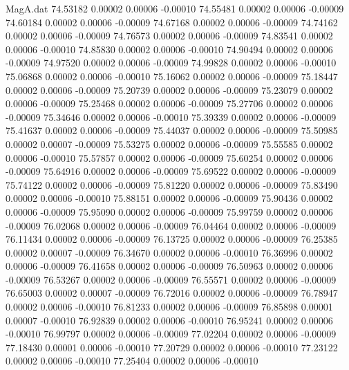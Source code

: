 \begin{filecontents}{MagA.dat}
  74.53182    0.00002    0.00006   -0.00010
  74.55481    0.00002    0.00006   -0.00009
  74.60184    0.00002    0.00006   -0.00009
  74.67168    0.00002    0.00006   -0.00009
  74.74162    0.00002    0.00006   -0.00009
  74.76573    0.00002    0.00006   -0.00009
  74.83541    0.00002    0.00006   -0.00010
  74.85830    0.00002    0.00006   -0.00010
  74.90494    0.00002    0.00006   -0.00009
  74.97520    0.00002    0.00006   -0.00009
  74.99828    0.00002    0.00006   -0.00010
  75.06868    0.00002    0.00006   -0.00010
  75.16062    0.00002    0.00006   -0.00009
  75.18447    0.00002    0.00006   -0.00009
  75.20739    0.00002    0.00006   -0.00009
  75.23079    0.00002    0.00006   -0.00009
  75.25468    0.00002    0.00006   -0.00009
  75.27706    0.00002    0.00006   -0.00009
  75.34646    0.00002    0.00006   -0.00010
  75.39339    0.00002    0.00006   -0.00009
  75.41637    0.00002    0.00006   -0.00009
  75.44037    0.00002    0.00006   -0.00009
  75.50985    0.00002    0.00007   -0.00009
  75.53275    0.00002    0.00006   -0.00009
  75.55585    0.00002    0.00006   -0.00010
  75.57857    0.00002    0.00006   -0.00009
  75.60254    0.00002    0.00006   -0.00009
  75.64916    0.00002    0.00006   -0.00009
  75.69522    0.00002    0.00006   -0.00009
  75.74122    0.00002    0.00006   -0.00009
  75.81220    0.00002    0.00006   -0.00009
  75.83490    0.00002    0.00006   -0.00010
  75.88151    0.00002    0.00006   -0.00009
  75.90436    0.00002    0.00006   -0.00009
  75.95090    0.00002    0.00006   -0.00009
  75.99759    0.00002    0.00006   -0.00009
  76.02068    0.00002    0.00006   -0.00009
  76.04464    0.00002    0.00006   -0.00009
  76.11434    0.00002    0.00006   -0.00009
  76.13725    0.00002    0.00006   -0.00009
  76.25385    0.00002    0.00007   -0.00009
  76.34670    0.00002    0.00006   -0.00010
  76.36996    0.00002    0.00006   -0.00009
  76.41658    0.00002    0.00006   -0.00009
  76.50963    0.00002    0.00006   -0.00009
  76.53267    0.00002    0.00006   -0.00009
  76.55571    0.00002    0.00006   -0.00009
  76.65003    0.00002    0.00007   -0.00009
  76.72016    0.00002    0.00006   -0.00009
  76.78947    0.00002    0.00006   -0.00010
  76.81233    0.00002    0.00006   -0.00009
  76.85898    0.00001    0.00007   -0.00010
  76.92839    0.00002    0.00006   -0.00010
  76.95241    0.00002    0.00006   -0.00010
  76.99797    0.00002    0.00006   -0.00009
  77.02204    0.00002    0.00006   -0.00009
  77.18430    0.00001    0.00006   -0.00010
  77.20729    0.00002    0.00006   -0.00010
  77.23122    0.00002    0.00006   -0.00010
  77.25404    0.00002    0.00006   -0.00010

\end{filecontents}
